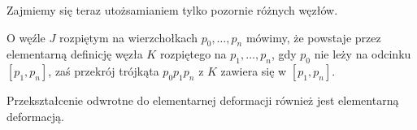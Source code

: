 Zajmiemy się teraz utożsamianiem tylko pozornie różnych węzłów.

\begin{definicja}
\label{elementarne_p}
	O węźle $J$ rozpiętym na wierzchołkach $p_0, \ldots, p_n$ mówimy, że powstaje przez elementarną definicję węzła $K$ rozpiętego na $p_1, \ldots, p_n$, gdy $p_0$ nie leży na odcinku $[p_1, p_n]$, zaś przekrój trójkąta $p_0p_1p_n$ z $K$ zawiera się w $[p_1, p_n]$.
\end{definicja}

Przekształcenie odwrotne do elementarnej deformacji również jest elementarną deformacją.







